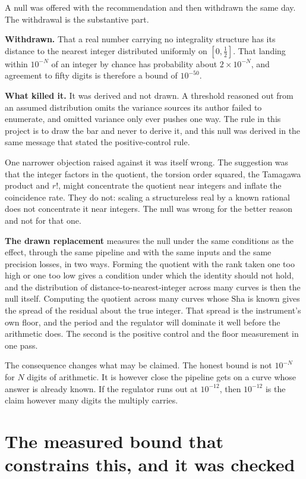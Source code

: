 A null was offered with the recommendation and then withdrawn the same day.
The withdrawal is the substantive part.

\textbf{Withdrawn.} That a real number carrying no integrality structure has its distance to the
nearest integer distributed uniformly on $[0,\tfrac12]$. That landing within $10^{-N}$ of an
integer by chance has probability about $2\times10^{-N}$, and agreement to fifty digits is
therefore a bound of $10^{-50}$.

\textbf{What killed it.} It was derived and not drawn. A threshold reasoned out from an assumed
distribution omits the variance sources its author failed to enumerate, and omitted variance only
ever pushes one way. The rule in this project is to draw the bar and never to derive it, and this
null was derived in the same message that stated the positive-control rule.

One narrower objection raised against it was itself wrong. The suggestion
was that the integer factors in the quotient, the torsion order squared, the Tamagawa product and
$r!$, might concentrate the quotient near integers and inflate the coincidence rate. They do not:
scaling a structureless real by a known rational does not concentrate it near integers. The null was
wrong for the better reason and not for that one.

\textbf{The drawn replacement} measures the null under the same conditions as the effect, through
the same pipeline and with the same inputs and the same precision losses, in two ways. Forming the
quotient with the rank taken one too high or one too low gives a condition under which the identity
should not hold, and the distribution of distance-to-nearest-integer across many curves is then the
null itself. Computing the quotient across many curves whose $\mathrm{Sha}$ is known gives the
spread of the residual about the true integer. That spread is the instrument's own floor, and the
period and the regulator will dominate it well before the arithmetic does. The second is the
positive control and the floor measurement in one pass.

The consequence changes what may be claimed. The honest bound is not $10^{-N}$ for $N$ digits of
arithmetic. It is however close the pipeline gets on a curve whose answer is already known. If the
regulator runs out at $10^{-12}$, then $10^{-12}$ is the claim however many digits the multiply
carries.

\section{The measured bound that constrains this, and it was checked}

